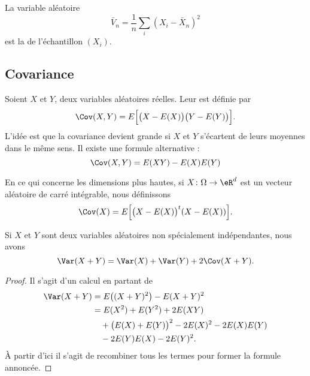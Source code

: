 La variable aléatoire 
\begin{equation}
    \bar V_n=\frac{1}{ n }\sum_i(X_i-\bar X_n)^2
\end{equation}
est la  de l'échantillon \( (X_i)\).

\subsection{Covariance}

Soient \( X\) et \( Y\), deux variables aléatoires réelles. Leur  est définie par
\begin{equation}
    \Cov(X,Y)=E\Big[ \big( X-E(X) \big)\big( Y-E(Y) \big) \Big].
\end{equation}
L'idée est que la covariance devient grande si \( X\) et \( Y\) s'écartent de leurs moyennes dans le même sens. Il existe une formule alternative :
\begin{equation}
    \Cov(X,Y)=E(XY)-E(X)E(Y)
\end{equation}

En ce qui concerne les dimensions plus hautes, si \( X\colon \Omega\to \eR^d\) est un vecteur aléatoire de carré intégrable, nous définissons
\begin{equation}
    \Cov(X)=E\Big[ \big( X-E(X) \big)^t(X-E(X)) \Big].
\end{equation}

\begin{proposition}     \label{PropoVarXpYCov}
    Si \( X\) et \( Y\) sont deux variables aléatoires non spécialement indépendantes, nous avons
    \begin{equation}
        \Var(X+Y)=\Var(X)+\Var(Y)+2\Cov(X+Y).
    \end{equation}
\end{proposition}

\begin{proof}
    Il s'agit d'un calcul en partant de
    \begin{equation}
        \begin{aligned}[]
            \Var(X+Y)&=E\big( (X+Y)^2 \big)-E(X+Y)^2\\
            &=E(X^2)+E(Y^2)+2E(XY)\\
            &\quad+\big( E(X)+E(Y) \big)^2-2E(X)^2-2E(X)E(Y)\\
            &\quad-2 E(Y)E(X)-2E(Y)^2.
        \end{aligned}
    \end{equation}
    À partir d'ici il s'agit de recombiner tous les termes pour former la formule annoncée.
\end{proof}

